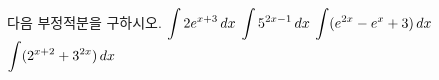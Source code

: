 다음 부정적분을 구하시오.
 $\displaystyle\int 2e^{x+3}\mkern3mu dx$
 $\displaystyle\int 5^{2x-1}\mkern3mu dx$
 $\displaystyle\int (e^{2x}-e^x+3)\mkern3mu dx$
 $\displaystyle\int (2^{x+2}+3^{2x})\mkern3mu dx$
